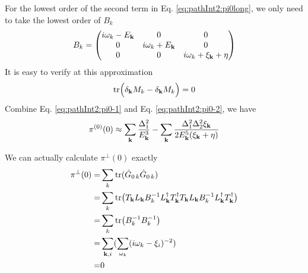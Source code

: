 For the lowest order of the second term in Eq. \eqref{eq:pathInt2:pi0long}, we only need to take the lowest order of $B_{k}$
\begin{equation}
B_{k}=\begin{pmatrix}i\omega_{k}-E_{\mathbf{k}}&0&0\\0&i\omega_{k}+E_{\mathbf{k}}&0\\0&0&i\omega_{k}+\xi_{\mathbf{k}}+\eta\end{pmatrix}
\end{equation}
It is easy to verify at this approximation
\begin{equation}\label{eq:pathInt2:pi0-2}
\text{tr}\Big(\delta_{\mathbf{k}}M_{k}-\delta_{\mathbf{k}}M_{k}\Big)=0
\end{equation}
Combine Eq. \eqref{eq:pathInt2:pi0-1} and Eq. \eqref{eq:pathInt2:pi0-2}, we have 
\begin{equation}
\pi^{(0)}(0)\approx\sum_{\mathbf{k}}\frac{\Delta_{1}^{2}}{E_{\mathbf{k}}^{3}}-\sum_{\mathbf{k}}\frac{\Delta_{1}^{2}\Delta_{2}^{2}\xi_{\mathbf{k}}}{2E_{\mathbf{k}}^{5}(\xi_{\mathbf{k}}+\eta)}\end{equation}

We can actually calculate  $\pi^{\perp}(0)$ exactly
\begin{equation}
\begin{split}
\pi^{\perp}(0)=&\sum_k\text{tr}(\hat{G}_{0\,k}\hat{G}_{0\,k})\\
	=&\sum_k\text{tr}\big(T_{\mathbf{k}}L_{\mathbf{k}}B_{k}^{-1}L_{\mathbf{k}}^{\dagger}T_{\mathbf{k}}^{\dagger}T_{\mathbf{k}}L_{\mathbf{k}}B_{k}^{-1}L_{\mathbf{k}}^{\dagger}T_{\mathbf{k}}^{\dagger}\big)\\
	=&\sum_k\text{tr}\big(B_{k}^{-1}B_{k}^{-1}\big)\\
	=&\sum_{\mathbf{k},i}(\sum_{\omega_{k}}(i\omega_{k}-\xi_{i})^{-2})\\
	=&0
\end{split}
\end{equation}


